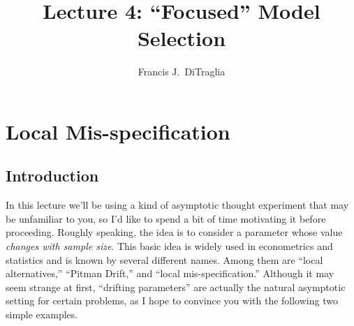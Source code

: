 \documentclass[12pt]{article}
\theoremstyle{definition}
\begin{document}
\title{Lecture 4: ``Focused'' Model Selection}

\author{Francis J.\ DiTraglia}

\maketitle 

\section{Local Mis-specification}

\subsection{Introduction}
In this lecture we'll be using a kind of asymptotic thought experiment that may be unfamiliar to you, so I'd like to spend a bit of time motivating it before proceeding. Roughly speaking, the idea is to consider a parameter whose value \emph{changes with sample size}. This basic idea is widely used in econometrics and statistics and is known by several different names. Among them are ``local alternatives,'' ``Pitman Drift,'' and ``local mis-specification.'' Although it may seem strange at first, ``drifting parameters'' are actually the natural asymptotic setting for certain problems, as I hope to convince you with the following two simple examples.
\end{document}

